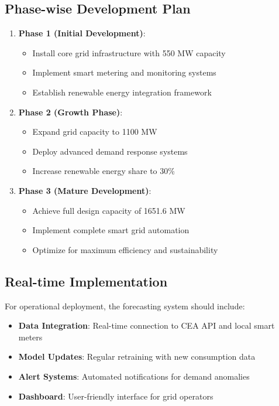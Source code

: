\documentclass[12pt,a4paper]{article}
\begin{document}
\subsection{Phase-wise Development Plan}
\begin{enumerate}
    \item \textbf{Phase 1 (Initial Development)}: 
    \begin{itemize}
        \item Install core grid infrastructure with 550 MW capacity
        \item Implement smart metering and monitoring systems
        \item Establish renewable energy integration framework
    \end{itemize}
    
    \item \textbf{Phase 2 (Growth Phase)}:
    \begin{itemize}
        \item Expand grid capacity to 1100 MW
        \item Deploy advanced demand response systems
        \item Increase renewable energy share to 30\%
    \end{itemize}
    
    \item \textbf{Phase 3 (Mature Development)}:
    \begin{itemize}
        \item Achieve full design capacity of 1651.6 MW
        \item Implement complete smart grid automation
        \item Optimize for maximum efficiency and sustainability
    \end{itemize}
\end{enumerate}

\subsection{Real-time Implementation}
For operational deployment, the forecasting system should include:

\begin{itemize}
    \item \textbf{Data Integration}: Real-time connection to CEA API and local smart meters
    \item \textbf{Model Updates}: Regular retraining with new consumption data
    \item \textbf{Alert Systems}: Automated notifications for demand anomalies
    \item \textbf{Dashboard}: User-friendly interface for grid operators
\end{itemize}
\end{document}
